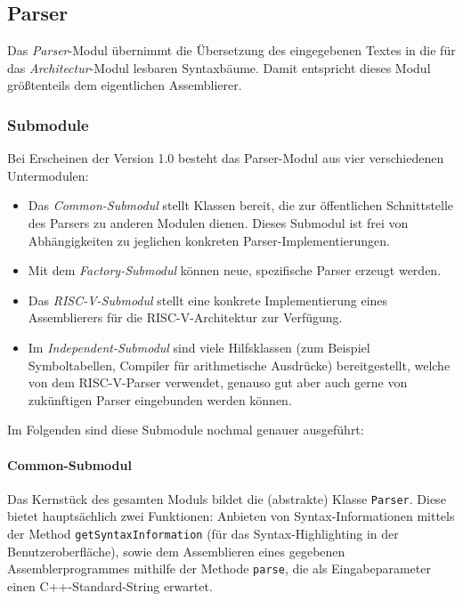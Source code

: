 \subsection{Parser}

Das \textit{Parser}-Modul übernimmt die Übersetzung des eingegebenen Textes in die für das \textit{Architectur}-Modul lesbaren Syntaxbäume. Damit entspricht dieses Modul größtenteils dem eigentlichen Assemblierer.

\subsubsection{Submodule}

Bei Erscheinen der Version 1.0 besteht das Parser-Modul aus vier verschiedenen Untermodulen:
\begin{itemize}
\item Das \emph{Common-Submodul} stellt Klassen bereit, die zur öffentlichen Schnittstelle des Parsers zu anderen Modulen dienen. Dieses Submodul ist frei von Abhängigkeiten zu jeglichen konkreten Parser-Implementierungen.
\item Mit dem \emph{Factory-Submodul} können neue, spezifische Parser erzeugt werden.
\item Das \emph{RISC-V-Submodul} stellt eine konkrete Implementierung eines Assemblierers für die RISC-V-Architektur zur Verfügung.
\item Im \emph{Independent-Submodul} sind viele Hilfsklassen (zum Beispiel Symboltabellen, Compiler für arithmetische Ausdrücke) bereitgestellt, welche von dem RISC-V-Parser verwendet, genauso gut aber auch gerne von zukünftigen Parser eingebunden werden können.
\end{itemize}
Im Folgenden sind diese Submodule nochmal genauer ausgeführt:

\paragraph{Common-Submodul}

Das Kernstück des gesamten Moduls bildet die (abstrakte) Klasse \texttt{Parser}. Diese bietet hauptsächlich zwei Funktionen: Anbieten von Syntax-Informationen mittels der Method \texttt{getSyntaxInformation} (für das Syntax-Highlighting in der Benutzeroberfläche), sowie dem Assemblieren eines gegebenen Assemblerprogrammes mithilfe der Methode \texttt{parse}, die als Eingabeparameter einen C++-Standard-String erwartet.

